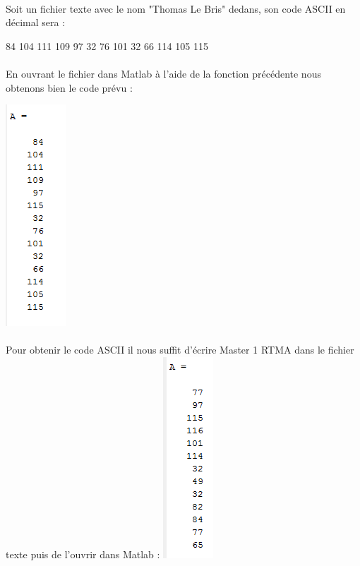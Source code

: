 \paragraph{} Soit un fichier texte avec le nom "Thomas Le Bris" dedans, son code ASCII en décimal sera :\begin{description}
\item[84 104 111 109 97 32 76 101  32 66 114 105 115]
\end{description}

\paragraph{} En ouvrant le fichier dans Matlab à l'aide de la fonction précédente nous obtenons bien le code prévu :

\includegraphics[scale=1]{ASCIInom.PNG}

\paragraph{} Pour obtenir le code ASCII il nous suffit d'écrire Master 1 RTMA dans le fichier texte puis de l'ouvrir dans Matlab :
\newline
\includegraphics[scale=1]{ASCIIrtma.PNG}

